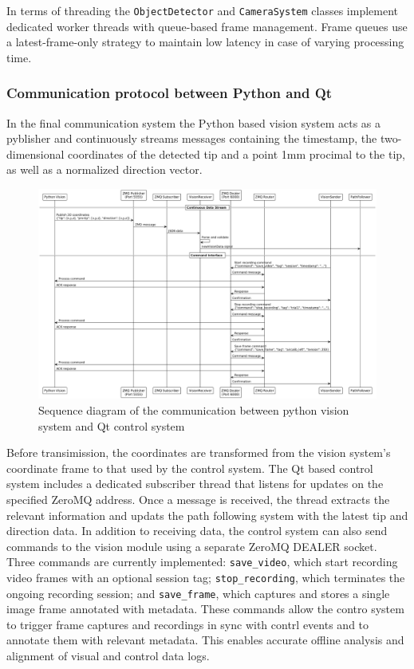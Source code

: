 In terms of threading the \texttt{ObjectDetector} and \texttt{CameraSystem} classes implement dedicated worker threads with queue-based frame management. Frame queues use a latest-frame-only strategy to maintain low latency in case of varying processing time.


\subsubsection{Communication protocol between Python and Qt}
In the final communication system the Python based vision system acts as a pyblisher and continuously streams messages containing the timestamp, the two-dimensional coordinates of the detected tip and a point 1mm procimal to the tip, as well as a normalized direction vector. 
\begin{figure} [H]
    \centering
    \includegraphics[width=1.1\linewidth]{images/Software documentation/visionSequencediag.png}
    \caption{Sequence diagram of the communication between python vision system and Qt control system}
    \label{fig:seqComm}
\end{figure}
Before transimission, the coordinates are transformed from the vision system's coordinate frame to that used by the control system. The Qt based control system includes a dedicated subscriber thread that listens for updates on the specified ZeroMQ address. Once a message is received, the thread extracts the relevant information and updats the path following system with the latest tip and direction data. 
\newline \newline
In addition to receiving data, the control system can also send commands to the vision module using a separate ZeroMQ DEALER socket. Three commands are currently implemented: \texttt{save\_video}, which start recording video frames with an optional session tag; \texttt{stop\_recording}, which terminates the ongoing recording session; and \texttt{save\_frame}, which captures and stores a single image frame annotated with metadata. These commands allow the contro system to trigger frame captures and recordings in sync with contrl events and to annotate them with relevant metadata. This enables accurate offline analysis and alignment of visual and control data logs.




